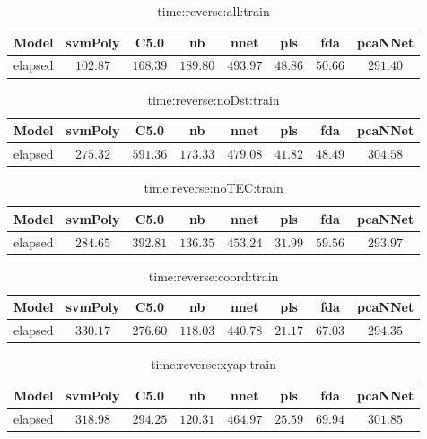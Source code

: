 \begin{table}[!ht]
	\centering
	\begin{tabular}{|c|c|c|c|c|c|c|c|}
		\hline
		Model & svmPoly & C5.0 & nb & nnet & pls & fda & pcaNNet \\ \hline
		elapsed & $102.87$ & $168.39$ & $189.80$ & $493.97$ & $48.86$ & $50.66$ & $291.40$ \\ \hline
	\end{tabular}
	\caption{time:reverse:all:train}
	\label{tab:time:reverse:all:train}
\end{table}

\begin{table}[!ht]
	\centering
	\begin{tabular}{|c|c|c|c|c|c|c|c|}
		\hline
		Model & svmPoly & C5.0 & nb & nnet & pls & fda & pcaNNet \\ \hline
		elapsed & $275.32$ & $591.36$ & $173.33$ & $479.08$ & $41.82$ & $48.49$ & $304.58$ \\ \hline
	\end{tabular}
	\caption{time:reverse:noDst:train}
	\label{tab:time:reverse:noDst:train}
\end{table}

\begin{table}[!ht]
	\centering
	\begin{tabular}{|c|c|c|c|c|c|c|c|}
		\hline
		Model & svmPoly & C5.0 & nb & nnet & pls & fda & pcaNNet \\ \hline
		elapsed & $284.65$ & $392.81$ & $136.35$ & $453.24$ & $31.99$ & $59.56$ & $293.97$ \\ \hline
	\end{tabular}
	\caption{time:reverse:noTEC:train}
	\label{tab:time:reverse:noTEC:train}
\end{table}

\begin{table}[!ht]
	\centering
	\begin{tabular}{|c|c|c|c|c|c|c|c|}
		\hline
		Model & svmPoly & C5.0 & nb & nnet & pls & fda & pcaNNet \\ \hline
		elapsed & $330.17$ & $276.60$ & $118.03$ & $440.78$ & $21.17$ & $67.03$ & $294.35$ \\ \hline
	\end{tabular}
	\caption{time:reverse:coord:train}
	\label{tab:time:reverse:coord:train}
\end{table}

\begin{table}[!ht]
	\centering
	\begin{tabular}{|c|c|c|c|c|c|c|c|}
		\hline
		Model & svmPoly & C5.0 & nb & nnet & pls & fda & pcaNNet \\ \hline
		elapsed & $318.98$ & $294.25$ & $120.31$ & $464.97$ & $25.59$ & $69.94$ & $301.85$ \\ \hline
	\end{tabular}
	\caption{time:reverse:xyap:train}
	\label{tab:time:reverse:xyap:train}
\end{table}


